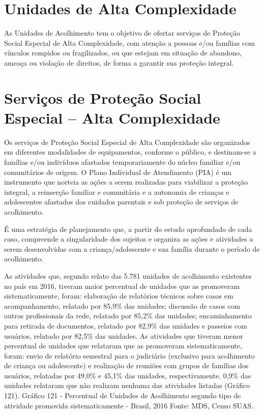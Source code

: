 \documentclass[
  brazilian]{report}
\begin{document}
\hypertarget{unidades-de-alta-complexidade}{%
\section{Unidades de Alta
Complexidade}\label{unidades-de-alta-complexidade}}

As Unidades de Acolhimento tem o objetivo de ofertar serviços de
Proteção Social Especial de Alta Complexidade, com atenção a pessoas
e/ou famílias com vínculos rompidos ou fragilizados, ou que estejam em
situação de abandono, ameaça ou violação de direitos, de forma a
garantir sua proteção integral.

\hypertarget{serviuxe7os-de-proteuxe7uxe3o-social-especial-alta-complexidade}{%
\section{Serviços de Proteção Social Especial -- Alta
Complexidade}\label{serviuxe7os-de-proteuxe7uxe3o-social-especial-alta-complexidade}}

Os serviços de Proteção Social Especial de Alta Complexidade são
organizados em diferentes modalidades de equipamentos, conforme o
público, e destinam-se a famílias e/ou indivíduos afastados
temporariamente do núcleo familiar e/ou comunitários de origem. O Plano
Individual de Atendimento (PIA) é um instrumento que norteia as ações a
serem realizadas para viabilizar a proteção integral, a reinserção
familiar e comunitária e a autonomia de crianças e adolescentes
afastados dos cuidados parentais e sob proteção de serviços de
acolhimento.

É uma estratégia de planejamento que, a partir do estudo aprofundado de
cada caso, compreende a singularidade dos sujeitos e organiza as ações e
atividades a serem desenvolvidas com a criança/adolescente e sua família
durante o período de acolhimento.

As atividades que, segundo relato das 5.781 unidades de acolhimento
existentes no país em 2016, tiveram maior percentual de unidades que as
promoveram sistematicamente, foram: elaboração de relatórios técnicos
sobre casos em acompanhamento, relatado por 85,9\% das unidades;
discussão de casos com outros profissionais da rede, relatado por 85,2\%
das unidades; encaminhamento para retirada de documentos, relatado por
82,9\% das unidades e passeios com usuários, relatado por 82,5\% das
unidades. As atividades que tiveram menor percentual de unidades que
relataram que as promoveram sistematicamente, foram: envio de relatório
semestral para o judiciário (exclusivo para acolhimento de criança ou
adolescente) e realização de reuniões com grupos de famílias dos
usuários, relatadas por 49,0\% e 45,1\% das unidades, respectivamente.
0,9\% das unidades relataram que não realizam nenhuma das atividades
listadas (Gráfico 121). Gráfico 121 - Percentual de Unidades de
Acolhimento segundo tipo de atividade promovida sistematicamente -
Brasil, 2016 Fonte: MDS, Censo SUAS.
\end{document}
